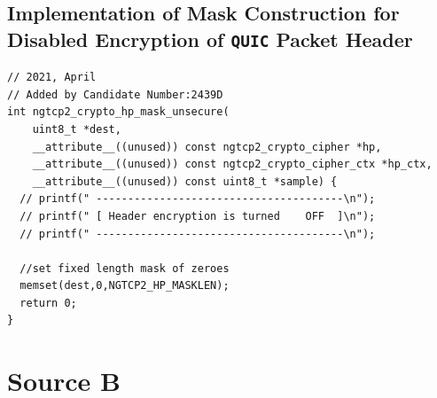 \documentclass[12pt,a4paper]{report}
\begin{document}
\section{Implementation of Mask Construction for Disabled Encryption of \texttt{QUIC} Packet Header} 
\label{Implementation_of_mask_generation}

\begin{verbatim}
// 2021, April
// Added by Candidate Number:2439D
int ngtcp2_crypto_hp_mask_unsecure(
    uint8_t *dest, 
    __attribute__((unused)) const ngtcp2_crypto_cipher *hp,
    __attribute__((unused)) const ngtcp2_crypto_cipher_ctx *hp_ctx,
    __attribute__((unused)) const uint8_t *sample) {
  // printf(" ---------------------------------------\n");
  // printf(" [ Header encryption is turned    OFF  ]\n");
  // printf(" ---------------------------------------\n");

  //set fixed length mask of zeroes
  memset(dest,0,NGTCP2_HP_MASKLEN);
  return 0;
}
\end{verbatim}


\chapter{Source B}
\end{document}
